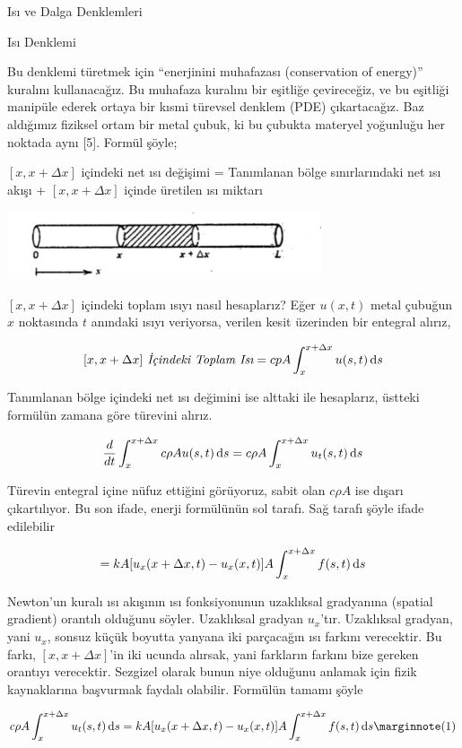 \documentclass[12pt,fleqn]{article}\usepackage{../../common}
\begin{document}
Isı ve Dalga Denklemleri

Isı Denklemi

Bu denklemi türetmek için ``enerjinini muhafazası (conservation of
energy)'' kuralını kullanacağız. Bu muhafaza kuralını bir eşitliğe
çevireceğiz, ve bu eşitliği manipüle ederek ortaya bir kısmi türevsel
denklem (PDE) çıkartacağız. Baz aldığımız fiziksel ortam bir metal çubuk,
ki bu çubukta materyel yoğunluğu her noktada aynı [5].  Formül şöyle;

$[x,x+\Delta x]$ içindeki net ısı değişimi = Tanımlanan bölge
sınırlarındaki net ısı akışı + $[x,x+\Delta x]$ içinde üretilen ısı miktarı

\includegraphics[height=2cm]{heat_1.png}

$[x,x+\Delta x]$ içindeki toplam ısıyı nasıl hesaplarız? Eğer $u(x,t)$
metal çubuğun $x$ noktasında $t$ anındaki ısıyı veriyorsa, verilen kesit
üzerinden bir entegral alırız,

$$
[x,x+\Delta x] \textit{ İçindeki Toplam Isı} = 
cpA \int _{ x}^{x+\Delta x}u(s,t) \,\mathrm{d} s
$$

Tanımlanan bölge içindeki net ısı değimini ise alttaki ile hesaplarız,
üstteki formülün zamana göre türevini alırız. 

$$
\frac{d}{dt} \int _{ x}^{x+\Delta x} c\rho A u(s,t) \,\mathrm{d} s = 
c\rho A  \int _{ x}^{x+\Delta x} u_t(s,t) \,\mathrm{d} s
$$

Türevin entegral içine nüfuz ettiğini görüyoruz, sabit olan $c\rho A$ ise
dışarı çıkartılıyor. Bu son ifade, enerji formülünün sol tarafı. Sağ tarafı
şöyle ifade edilebilir

$$ = kA [ u_x(x+\Delta x,t) - u_x(x,t)] A \int _{x}^{x+\Delta x} f(s,t) \,\mathrm{d} s $$

Newton'un kuralı ısı akışının ısı fonksiyonunun uzaklıksal gradyanına
(spatial gradient) orantılı olduğunu söyler. Uzaklıksal gradyan
$u_x$'tır. Uzaklıksal gradyan, yani $u_x$, sonsuz küçük boyutta yanyana iki
parçacağın ısı farkını verecektir. Bu farkı, $[x,x+\Delta x]$'in iki ucunda
alırsak, yani farkların farkını bize gereken orantıyı verecektir. Sezgizel
olarak bunun niye olduğunu anlamak için fizik kaynaklarına başvurmak
faydalı olabilir. Formülün tamamı şöyle

$$
c\rho A  \int _{ x}^{x+\Delta x} u_t(s,t) \ud s =
kA [ u_x(x+\Delta x,t) - u_x(x,t)] A \int _{x}^{x+\Delta x} f(s,t) \ud s 
\mlabel{1}
$$
\end{document}
